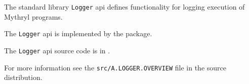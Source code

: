 
The standard library {\tt Logger} api defines functionality for logging execution of Mythryl programs.

The {\tt Logger} api is implemented by the  package.

The {\tt Logger} api source code is in .

For more information see the {\tt src/A.LOGGER.OVERVIEW} file in the source distribution.
